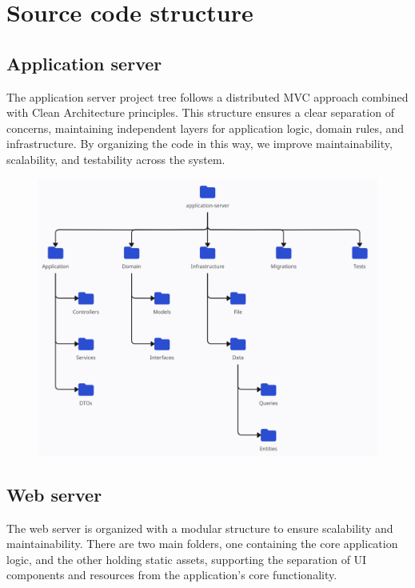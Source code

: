 \chapter{Source code structure}

\section{Application server}

The application server project tree follows a distributed MVC approach combined with Clean Architecture principles.
This structure ensures a clear separation of concerns, maintaining independent layers for application logic, domain rules, and infrastructure. By organizing the code in this way, we improve maintainability, scalability, and testability across the system.

\begin{figure}[H]
    \centering
    \includegraphics[width=0.8\linewidth]{../assets/folder-tree/application-server.png}
\end{figure}

\section{Web server}

The web server is organized with a modular structure to ensure scalability and maintainability.
There are two main folders, one containing the core application logic, and the other holding static assets, supporting the separation of UI components and resources from the application’s core functionality.

